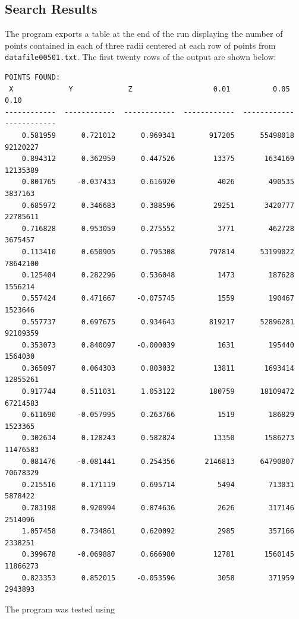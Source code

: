 %
%

\subsection{Search Results}

The program exports a table at the end of the run displaying the number of points contained in each of three radii centered at each row of points from  \texttt{datafile00501.txt}. The first twenty rows of the output are shown below:

\begin{minipage}{\linewidth}
\begin{verbatim}
POINTS FOUND:
 X             Y             Z                   0.01          0.05          0.10
------------  ------------  ------------  ------------  ------------  ------------
    0.581959      0.721012      0.969341        917205      55498018      92120227
    0.894312      0.362959      0.447526         13375       1634169      12135389
    0.801765     -0.037433      0.616920          4026        490535       3837163
    0.685972      0.346683      0.388596         29251       3420777      22785611
    0.716828      0.953059      0.275552          3771        462728       3675457
    0.113410      0.650905      0.795308        797814      53199022      78642100
    0.125404      0.282296      0.536048          1473        187628       1556214
    0.557424      0.471667     -0.075745          1559        190467       1523646
    0.557737      0.697675      0.934643        819217      52896281      92109359
    0.353073      0.840097     -0.000039          1631        195440       1564030
    0.365097      0.064303      0.803032         13811       1693414      12855261
    0.917744      0.511031      1.053122        180759      18109472      67214583
    0.611690     -0.057995      0.263766          1519        186829       1523365
    0.302634      0.128243      0.582824         13350       1586273      11476583
    0.081476     -0.081441      0.254356       2146813      64790807      70678329
    0.215516      0.171119      0.695714          5494        713031       5878422
    0.783198      0.920994      0.874636          2626        317146       2514096
    1.057458      0.734861      0.620092          2985        357166       2338251
    0.399678     -0.069887      0.666980         12781       1560145      11866273
    0.823353      0.852015     -0.053596          3058        371959       2943893
\end{verbatim}
\end{minipage}

The program was tested using 
